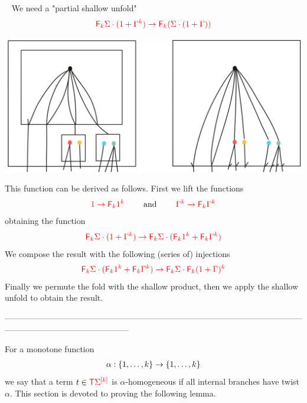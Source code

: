 \begin{example}~\label{ex:PartialShallowUnfold}
We need a "partial shallow unfold"
\begin{align*}
{\color{red}{{\color{red}{\mathsf F_{k}}}\Sigma\cdot (1+\Gamma^k)\to {\color{red}{\mathsf F_{k}}}(\Sigma\cdot(1+\Gamma))}}
\end{align*}
\begin{center}
\includegraphics[scale=.09]{MyPicPartialShallowUnfold.jpg}
\end{center}
This function can be derived as follows. First we lift the functions
\begin{align*}
{\color{red}{1\to {\color{red}{\mathsf F_{k}}}1^k}}\qquad \text{ and } \qquad{\color{red}{\Gamma^k\to {\color{red}{\mathsf F_{k}}}\Gamma^k}}
\end{align*}
obtaining the function
\begin{align*}
{\color{red}{{\color{red}{\mathsf F_{k}}}\Sigma\cdot (1+\Gamma^k)\to {\color{red}{\mathsf F_{k}}}\Sigma\cdot ({\color{red}{\mathsf F_{k}}}1^k+{\color{red}{\mathsf F_{k}}}\Gamma^k) }}
\end{align*}
We compose the result with the following  (series of) injections
\begin{align*}
{\color{red}{{\color{red}{\mathsf F_{k}}}\Sigma\cdot ({\color{red}{\mathsf F_{k}}}1^k+{\color{red}{\mathsf F_{k}}}\Gamma^k)\to {\color{red}{\mathsf F_{k}}}\Sigma\cdot {\color{red}{\mathsf F_{k}}}(1+\Gamma)^k}}
\end{align*}
Finally we permute the fold with the shallow product, then we apply the shallow unfold to obtain the result.
\end{example}
---------------------------------------------------------------------------------------------------------------------------------------------------------
\bigskip

For a monotone function 
\begin{align*}
\alpha: \{1,\ldots,k\} \to \{1,\ldots,k\}
\end{align*}
we say that a term $ t \in {\color{red}{\mathsf T}} {\color{red}{\Sigma}}^{{\color{red}{[k]}}}$ is $\alpha$-homogeneous if all internal branches have twist $\alpha$. This section is devoted to proving the following lemma. 

